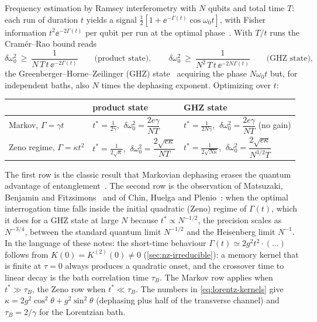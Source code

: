 Frequency estimation by Ramsey interferometry with $N$ qubits and total time $T$: each run of duration $t$ yields a signal $\tfrac12[1+\ee^{-\Gamma(t)}\cos\omega_0t]$, with Fisher information $t^2\ee^{-2\Gamma(t)}$ per qubit per run at the optimal phase~\cite{Braunstein1994}.
With $T/t$ runs the Cram\'er--Rao bound reads
\begin{equation}
  \delta\omega_0^2\ \ge\ \frac{1}{N\,T\,t\,\ee^{-2\Gamma(t)}}\qquad\text{(product state)},\qquad
  \delta\omega_0^2\ \ge\ \frac{1}{N^2\,T\,t\,\ee^{-2N\Gamma(t)}}\qquad\text{(GHZ state)},
\end{equation}
the Greenberger--Horne--Zeilinger (GHZ) state~\cite{GHZ1989} acquiring the phase $N\omega_0t$ but, for independent baths, also $N$ times the dephasing exponent.
Optimizing over $t$:
\begin{center}
\renewcommand{\arraystretch}{1.3}
\begin{tabular}{@{}lll@{}}
\toprule
& product state & GHZ state\\
\midrule
Markov, $\Gamma=\gamma t$ & $t^*=\tfrac1{2\gamma}$, $\ \delta\omega_0^2=\dfrac{2e\gamma}{NT}$ & $t^*=\tfrac{1}{2N\gamma}$, $\ \delta\omega_0^2=\dfrac{2e\gamma}{NT}$ (no gain)\\[6pt]
Zeno regime, $\Gamma=\kappa t^2$ & $t^*=\tfrac{1}{2\sqrt\kappa}$, $\ \delta\omega_0^2=\dfrac{2\sqrt{e\kappa}}{NT}$ & $t^*=\tfrac{1}{2\sqrt{N\kappa}}$, $\ \delta\omega_0^2=\dfrac{2\sqrt{e\kappa}}{N^{3/2}T}$\\
\bottomrule
\end{tabular}
\end{center}
The first row is the classic result that Markovian dephasing erases the quantum advantage of entanglement~\cite{Huelga1997}.
The second row is the observation of Matsuzaki, Benjamin and Fitzsimons~\cite{Matsuzaki2011} and of Chin, Huelga and Plenio~\cite{Chin2012}: when the optimal interrogation time falls inside the initial quadratic (Zeno) regime of $\Gamma(t)$, which it does for a GHZ state at large $N$ because $t^*\propto N^{-1/2}$, the precision scales as $N^{-3/4}$, between the standard quantum limit $N^{-1/2}$ and the Heisenberg limit $N^{-1}$.
In the language of these notes: the short-time behaviour $\Gamma(t)\simeq2g^2t^2\cdot(\ldots)$ follows from $K(0)=K^{(2)}(0)\ne0$ (\cref{sec:nz-irreducible}): a memory kernel that is finite at $\tau=0$ always produces a quadratic onset, and the crossover time to linear decay is the bath correlation time $\tau_B$.
The Markov row applies when $t^*\gg\tau_B$, the Zeno row when $t^*\ll\tau_B$.
The numbers in \cref{eq:lorentz-kernels} give $\kappa=2g^2\cos^2\theta+g^2\sin^2\theta$ (dephasing plus half of the transverse channel) and $\tau_B=2/\gamma$ for the Lorentzian bath.

